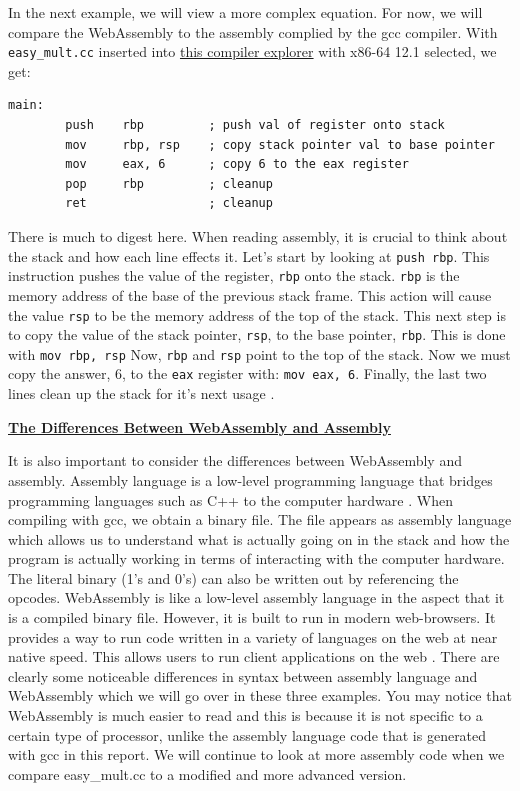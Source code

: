 \documentclass{article}
\theoremstyle{theorem}
\theoremstyle{definition}
\theoremstyle{remark}
\begin{document}
\medskip\noindent
In the next example, we will view a more complex equation. For now, we will compare the WebAssembly to the assembly complied by the gcc compiler. With \verb|easy_mult.cc| inserted into \href{https://godbolt.org/}{this compiler explorer} with x86-64 12.1 selected, we get:

\medskip\noindent
\begin{lstlisting}[style=AsmStyle]
    main:
        push    rbp         ; push val of register onto stack
        mov     rbp, rsp    ; copy stack pointer val to base pointer
        mov     eax, 6      ; copy 6 to the eax register
        pop     rbp         ; cleanup
        ret                 ; cleanup
\end{lstlisting}

\medskip\noindent
There is much to digest here. When reading assembly, it is crucial to think about the stack and how each line effects it. Let's start by looking at \verb|push rbp|. This instruction pushes the value of the register, \verb|rbp| onto the stack. \verb|rbp| is the memory address of the base of the previous stack frame. This action will cause the value \verb|rsp| to be the memory address of the top of the stack. This next step is to copy the value of the stack pointer, \verb|rsp|, to the base pointer, \verb|rbp|. This is done with \verb|mov rbp, rsp| Now, \verb|rbp| and \verb|rsp| point to the top of the stack. Now we must copy the answer, 6, to the \verb|eax| register with: \verb|mov eax, 6|. Finally, the last two lines clean up the stack for it's next usage \cite{AC}.

\bigskip\noindent
\underline{\textbf{The Differences Between WebAssembly and Assembly}}

\medskip
It is also important to consider the differences between WebAssembly and assembly. Assembly language is a low-level programming language that bridges programming languages such as C++ to the computer hardware \cite{AL}. When compiling with gcc, we obtain a binary file. The file appears as assembly language which allows us to understand what is actually going on in the stack and how the program is actually working in terms of interacting with the computer hardware. The literal binary (1's and 0's) can also be written out by referencing the opcodes. WebAssembly is like a low-level assembly language in the aspect that it is a compiled binary file. However, it is built to run in modern web-browsers. It provides a way to run code written in a variety of languages on the web at near native speed. This allows users to run client applications on the web \cite{WA}. There are clearly some noticeable differences in syntax between assembly language and WebAssembly which we will go over in these three examples. You may notice that WebAssembly is much easier to read and this is because it is not specific to a certain type of processor, unlike the assembly language code that is generated with gcc in this report. We will continue to look at more assembly code when we compare easy\_mult.cc to a modified and more advanced version.
\end{document}
